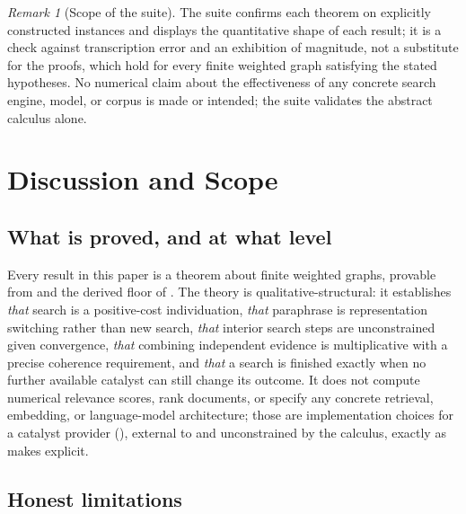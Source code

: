 \documentclass[11pt,twocolumn,a4paper]{article}
\theoremstyle{thmstyle}
\theoremstyle{definition}
\theoremstyle{remark}
\newtheorem{remark}[theorem]{Remark}
\begin{document}
\begin{remark}[Scope of the suite]
\label{rem:val-scope}
The suite confirms each theorem on explicitly constructed instances and
displays the quantitative shape of each result; it is a check against
transcription error and an exhibition of magnitude, not a substitute for
the proofs, which hold for every finite weighted graph satisfying the
stated hypotheses. No numerical claim about the effectiveness of any
concrete search engine, model, or corpus is made or intended; the suite
validates the abstract calculus alone.
\end{remark}

\section{Discussion and Scope}
\label{sec:discussion}

\subsection{What is proved, and at what level}

Every result in this paper is a theorem about finite weighted graphs,
provable from  and the derived floor of
. The theory is qualitative-structural: it establishes
\emph{that} search is a positive-cost individuation, \emph{that}
paraphrase is representation switching rather than new search, \emph{that}
interior search steps are unconstrained given convergence, \emph{that}
combining independent evidence is multiplicative with a precise coherence
requirement, and \emph{that} a search is finished exactly when no further
available catalyst can still change its outcome. It does not compute
numerical relevance scores, rank documents, or specify any concrete
retrieval, embedding, or language-model architecture; those are
implementation choices for a catalyst provider (),
external to and unconstrained by the calculus, exactly as
 makes explicit.

\subsection{Honest limitations}
\end{document}

